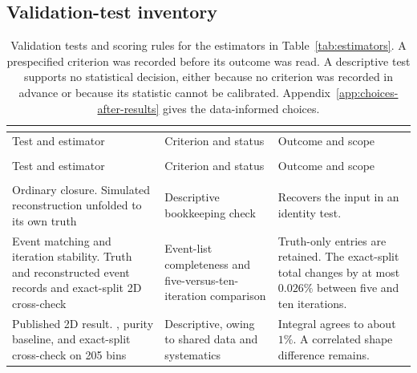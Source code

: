 \clearpage
\subsection{Validation-test inventory}
\label{app:validation-inventory}

\begingroup \small
\setlength{\LTcapwidth}{\textwidth}
\setlength{\LTpre}{4pt}
\setlength{\LTpost}{0pt}
\makeatletter
\ifdefined\XLT@refstepcounter \ifdefined\H@refstepcounter
    \let\XLT@refstepcounter\H@refstepcounter
  \fi
\fi
\makeatother
\begin{xltabular}{\textwidth}{@{}
  >{\footnotesize\RaggedRight\arraybackslash{}\hsize}X >{\footnotesize\RaggedRight\arraybackslash{}\hsize}X >{\footnotesize\RaggedRight\arraybackslash{}\hsize}X@{}}
  \caption{Validation tests and scoring rules for the estimators in Table~\ref{tab:estimators}. A prespecified criterion was recorded before its outcome was read. A descriptive test supports no statistical decision, either because no criterion was recorded in advance or because its statistic cannot be calibrated. Appendix~\ref{app:choices-after-results} gives the data-informed choices.}
  \label{tab:validation-inventory}\label{tab:test-index}\label{tab:closure-map}\\
  \toprule Test and estimator & Criterion and status & Outcome and scope \\
  \midrule \endfirsthead {} \\
  \toprule Test and estimator & Criterion and status & Outcome and scope \\
  \midrule \endhead \bottomrule \endfoot {} \\
  \addlinespace[1.5pt] Ordinary closure. Simulated reconstruction unfolded to its own truth & Descriptive bookkeeping check & Recovers the input in an identity test. \\
  \addlinespace[1.5pt] Event matching and iteration stability. Truth and reconstructed event records and exact-split 2D cross-check & Event-list completeness and five-versus-ten-iteration comparison & Truth-only entries are retained. The exact-split total changes by at most $0.026\%$ between five and ten iterations. \\
  \addlinespace[1.5pt] Published 2D result. \estTwoD{}, purity baseline, and exact-split cross-check on 205 bins & Descriptive, owing to shared data and systematics & Integral agrees to about $1\%$. A correlated shape difference remains. \\

\end{xltabular}
